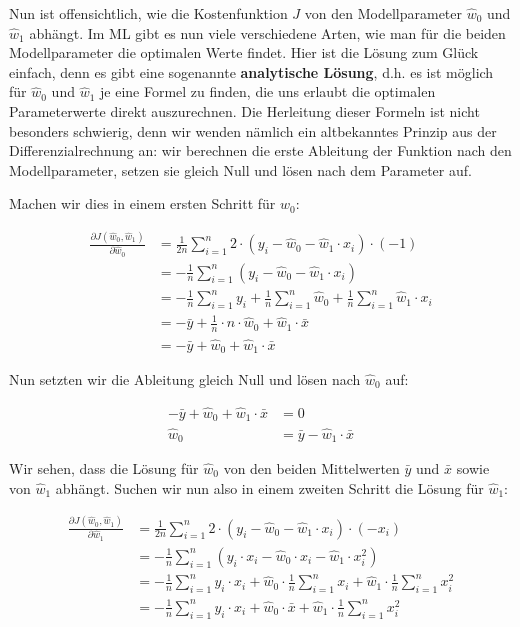 \documentclass[
]{book}
\begin{document}
Nun ist offensichtlich, wie die Kostenfunktion \(J\) von den Modellparameter \(\hat{w}_0\) und \(\hat{w}_1\) abhängt. Im ML gibt es nun viele verschiedene Arten, wie man für die beiden Modellparameter die optimalen Werte findet. Hier ist die Lösung zum Glück einfach, denn es gibt eine sogenannte \textbf{analytische Lösung}, d.h. es ist möglich für \(\hat{w}_0\) und \(\hat{w}_1\) je eine Formel zu finden, die uns erlaubt die optimalen Parameterwerte direkt auszurechnen. Die Herleitung dieser Formeln ist nicht besonders schwierig, denn wir wenden nämlich ein altbekanntes Prinzip aus der Differenzialrechnung an: wir berechnen die erste Ableitung der Funktion nach den Modellparameter, setzen sie gleich Null und lösen nach dem Parameter auf.

Machen wir dies in einem ersten Schritt für \(\hat{w}_0\):

\begin{align}
\frac{\partial J(\hat{w}_0, \hat{w}_1)}{\partial \hat{w}_0} &= \frac{1}{2n} \sum_{i=1}^{n} 2 \cdot \left(y_i - \hat{w}_0 - \hat{w}_1 \cdot x_i \right) \cdot (-1) \\
&= -\frac{1}{n} \sum_{i=1}^{n} \left(y_i - \hat{w}_0 - \hat{w}_1 \cdot x_i \right) \\
&= -\frac{1}{n} \sum_{i=1}^{n} y_i +  \frac{1}{n} \sum_{i=1}^{n} \hat{w}_0 + \frac{1}{n} \sum_{i=1}^{n} \hat{w}_1 \cdot x_i \\
&= -\bar{y} + \frac{1}{n} \cdot n \cdot \hat{w}_0 + \hat{w}_1 \cdot \bar{x} \\
&= -\bar{y} + \hat{w}_0 + \hat{w}_1 \cdot \bar{x}
\end{align}

Nun setzten wir die Ableitung gleich Null und lösen nach \(\hat{w}_0\) auf:

\begin{align}
-\bar{y} + \hat{w}_0 + \hat{w}_1 \cdot \bar{x} &= 0 \\
\hat{w}_0 &= \bar{y} - \hat{w}_1 \cdot \bar{x}
\end{align}

Wir sehen, dass die Lösung für \(\hat{w}_0\) von den beiden Mittelwerten \(\bar{y}\) und \(\bar{x}\) sowie von \(\hat{w}_1\) abhängt. Suchen wir nun also in einem zweiten Schritt die Lösung für \(\hat{w}_1\):

\begin{align}
\frac{\partial J(\hat{w}_0, \hat{w}_1)}{\partial \hat{w}_1} &= \frac{1}{2n} \sum_{i=1}^{n} 2 \cdot \left(y_i - \hat{w}_0 - \hat{w}_1 \cdot x_i \right) \cdot (-x_i) \\
&= -\frac{1}{n} \sum_{i=1}^{n} \left(y_i \cdot x_i - \hat{w}_0 \cdot x_i - \hat{w}_1 \cdot x_i^2 \right) \\
&= -\frac{1}{n} \sum_{i=1}^{n} y_i \cdot x_i + \hat{w}_0 \cdot \frac{1}{n} \sum_{i=1}^{n} x_i + \hat{w}_1 \cdot \frac{1}{n} \sum_{i=1}^{n} x_i^2 \\
&= -\frac{1}{n} \sum_{i=1}^{n} y_i \cdot x_i + \hat{w}_0 \cdot \bar{x} + \hat{w}_1 \cdot \frac{1}{n} \sum_{i=1}^{n} x_i^2 \\
\end{align}
\end{document}
